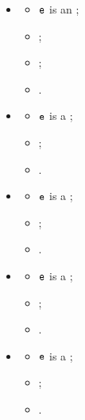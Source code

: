 \begin{itemize}
  \item {}
  \begin{itemize}
    \item $\texttt{e}$ is an \getarrayexpression{$\veone$}{$\vetwo$};
    \item \Proserenamelocalsexpr{$\veone$}{$\veonep$};
    \item \Proserenamelocalsexpr{$\vetwo$}{$\vetwop$};
    \item {}.
  \end{itemize}

  \item {}
  \begin{itemize}
    \item $\texttt{e}$ is a \getfieldexpression{$\veone$}{$\vf$};
    \item \Proserenamelocalsexpr{$\veone$}{$\veonep$};
    \item {}.
  \end{itemize}

  \item {}
  \begin{itemize}
    \item $\texttt{e}$ is a \getfieldsexpression{$\veone$}{$\vli$};
    \item \Proserenamelocalsexpr{$\veone$}{$\veonep$};
    \item {}.
  \end{itemize}

  \item {}
  \begin{itemize}
    \item $\texttt{e}$ is a \getitemexpression{$\veone$}{$\vi$};
    \item \Proserenamelocalsexpr{$\veone$}{$\veonep$};
    \item {}.
  \end{itemize}

  \item {}
  \begin{itemize}
    \item $\texttt{e}$ is a \recordexpression{$\vt$}{$\vli$};
    \item \Proserenamelocalsty{$\vt$}{$\vtp$};
    \item {}.
  \end{itemize}


\end{itemize}
